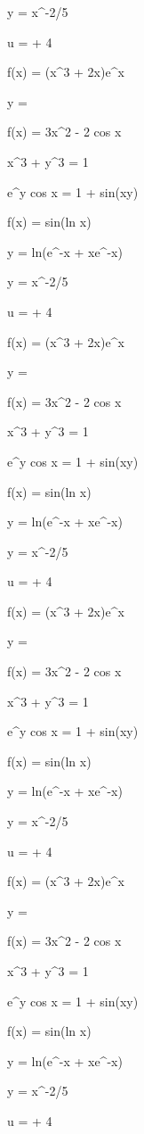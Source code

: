 \documentclass[11pt,a4paper]{article}
\begin{document}
y = x^{-2/5}

u =  + 4

f(x) = (x^3 + 2x)e^x

y = 

f(x) = 3x^2 - 2 cos x


 x^3 + y^3 = 1

 e^y cos x = 1 + sin(xy)

 f(x) = sin(ln x)

 y = ln(e^{-x} + xe^{-x})

y = x^{-2/5}

u =  + 4

f(x) = (x^3 + 2x)e^x

y = 

f(x) = 3x^2 - 2 cos x


 x^3 + y^3 = 1

 e^y cos x = 1 + sin(xy)

 f(x) = sin(ln x)

 y = ln(e^{-x} + xe^{-x})

y = x^{-2/5}

u =  + 4

f(x) = (x^3 + 2x)e^x

y = 

f(x) = 3x^2 - 2 cos x


 x^3 + y^3 = 1

 e^y cos x = 1 + sin(xy)

 f(x) = sin(ln x)

 y = ln(e^{-x} + xe^{-x})

y = x^{-2/5}

u =  + 4

f(x) = (x^3 + 2x)e^x

y = 

f(x) = 3x^2 - 2 cos x


 x^3 + y^3 = 1

 e^y cos x = 1 + sin(xy)

 f(x) = sin(ln x)

 y = ln(e^{-x} + xe^{-x})

y = x^{-2/5}

u =  + 4
\end{document}
